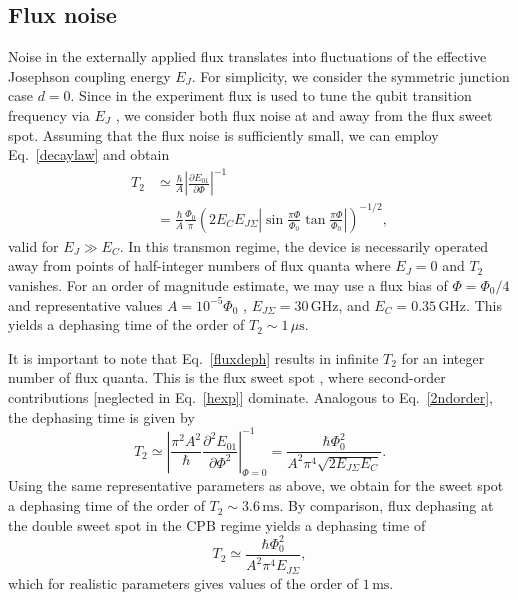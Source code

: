 \documentclass[twocolumn,amsmath,amssymb,floatfix,pra,showpacs,eqsecnum,footinbib,superscriptaddress]{revtex4}
\newcommand{\abs}[1]{\left|#1\right|}
\newcommand{\be}{\begin{equation}}
\newcommand{\ee}{\end{equation}}
\begin{document}
\subsection{Flux noise}
Noise in the externally applied flux translates into fluctuations of the effective Josephson coupling energy $E_J$. For simplicity, we consider the symmetric junction case $d=0$. Since in the experiment flux is used to tune the qubit transition frequency via $E_J$ \cite{houck}, we consider both flux noise at and away from the flux sweet spot.  Assuming that the flux noise is sufficiently small, we can employ Eq.~\eqref{decaylaw} and obtain
\begin{align}\label{fluxdeph}
T_2&\simeq \frac{\hbar}{A}\abs{\frac{\partial E_{01}}{\partial \Phi}}^{-1} \\\nonumber
&= \frac{\hbar}{A}\frac{\Phi_0}{\pi}\left(2E_CE_{J\Sigma} \abs{\sin \frac{\pi\Phi}{\Phi_0} \tan \frac{\pi\Phi}{\Phi_0}}\right)^{-1/2},
\end{align}
valid for $E_J\gg E_C$. In this transmon regime, the device is necessarily operated away from points of half-integer numbers of flux quanta where $E_J=0$ and $T_2$ vanishes. For an order of magnitude estimate, we may use a flux bias of $\Phi=\Phi_0/4$ and representative values $A=10^{-5}\Phi_0$ \cite{wellstood},  $E_{J\Sigma}=30\,\text{GHz}$, and $E_C=0.35\,\text{GHz}$. This yields a dephasing time of the order of $T_2\sim 1\,\mu\text{s}$. 

It is important to note that Eq.~\eqref{fluxdeph} results in infinite $T_2$ for an integer number of flux quanta. This is the flux sweet spot \cite{vion2}, where second-order contributions [neglected in Eq.~\eqref{hexp}] dominate. Analogous to Eq.~\eqref{2ndorder}, the dephasing time is given by
\be
T_2\simeq \abs{ \frac{\pi^2A^2}{\hbar}\frac{\partial^2 E_{01}}{\partial \Phi^2}}^{-1}_{\Phi=0}=\frac{\hbar\Phi_0^2}{A^2\pi^4\sqrt{2E_{J\Sigma}E_C} }.
\ee
Using the same representative parameters as above, we obtain for the sweet spot a dephasing time of the order of $T_2\sim 3.6\,\text{ms}$. By comparison, flux dephasing at the double sweet spot in the CPB regime yields a dephasing time of
\be
T_2\simeq \frac{\hbar\Phi_0^2}{A^2\pi^4 E_{J\Sigma}},
\ee
which for realistic parameters gives values of the order of $1\,\text{ms}$.
\end{document}
